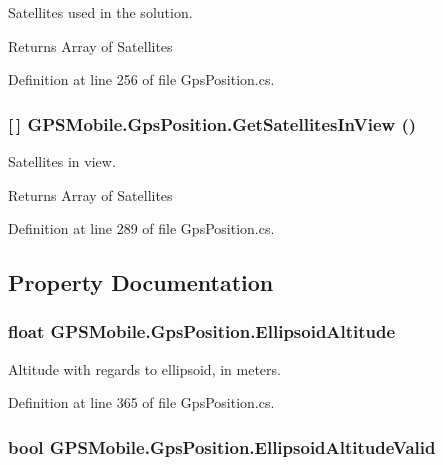 Satellites used in the solution. \begin{DoxyReturn}{Returns}
Array of Satellites
\end{DoxyReturn}


Definition at line 256 of file GpsPosition.cs.\hypertarget{class_g_p_s_mobile_1_1_gps_position_a68e3bfcd6b812463ec2f035ca4e5a32b}{
\subsubsection[{GetSatellitesInView}]{ \mbox{[}$\,$\mbox{]} GPSMobile.GpsPosition.GetSatellitesInView ()}}
\label{class_g_p_s_mobile_1_1_gps_position_a68e3bfcd6b812463ec2f035ca4e5a32b}


Satellites in view. \begin{DoxyReturn}{Returns}
Array of Satellites
\end{DoxyReturn}


Definition at line 289 of file GpsPosition.cs.

\subsection{Property Documentation}
\hypertarget{class_g_p_s_mobile_1_1_gps_position_ad91c88bac71cc38c4a69a3e554abe6e4}{
\subsubsection[{EllipsoidAltitude}]{\setlength{\rightskip}{0pt plus 5cm}float GPSMobile.GpsPosition.EllipsoidAltitude}}
\label{class_g_p_s_mobile_1_1_gps_position_ad91c88bac71cc38c4a69a3e554abe6e4}


Altitude with regards to ellipsoid, in meters. 

Definition at line 365 of file GpsPosition.cs.\hypertarget{class_g_p_s_mobile_1_1_gps_position_aed0b8f9f01766832588f42446cef6208}{
\subsubsection[{EllipsoidAltitudeValid}]{\setlength{\rightskip}{0pt plus 5cm}bool GPSMobile.GpsPosition.EllipsoidAltitudeValid}}
\label{class_g_p_s_mobile_1_1_gps_position_aed0b8f9f01766832588f42446cef6208}


